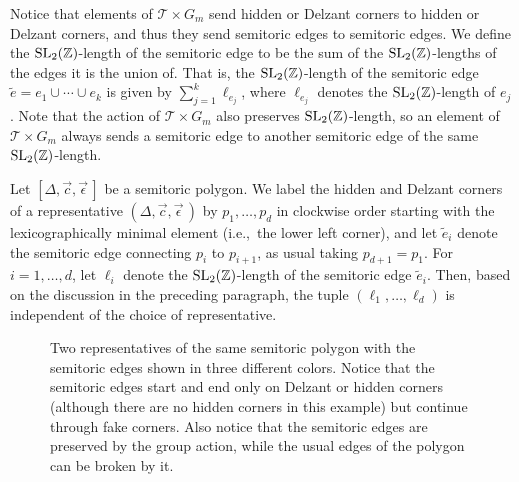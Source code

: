 \documentclass[pdftex]{sigma}
\numberwithin{equation}{section}
\def\Z{{\mathbb Z}}
\newcommand{\De}{\Delta}
\newcommand{\SL}{{\rm SL}_2(\Z)}
\newcommand{\stpoly}{[\De,\vec{c},\vec{\epsilon}\,]}
\newcommand{\strep}{(\De,\vec{c},\vec{\epsilon}\,)}
\begin{document}
Notice that elements of $\mathcal{T}\times G_m$ send hidden or Delzant corners to hidden or Delzant corners, and thus they send semitoric edges to semitoric edges.
We define the $\SL$-length of the semitoric edge to be the sum of the $\SL$-lengths of the edges it is the union of. That is, the $\SL$-length of the semitoric edge $\tilde{e} = e_1\cup \cdots \cup e_k$ is given by $\sum_{j=1}^k \ell_{e_j}$, where $\ell_{e_j}$ denotes the $\SL$-length of $e_j$.
Note that the action of $\mathcal{T}\times G_m$ also preserves $\SL$-length, so an element of $\mathcal{T}\times G_m$ always sends a semitoric edge to another semitoric edge of the same $\SL$-length.

Let $\stpoly$ be a semitoric polygon. We label the hidden and Delzant corners of a representative $\strep$ by $p_1,\ldots,p_d$ in clockwise order starting with the lexicographically minimal element (i.e.,~the lower left corner), and let $\tilde{e}_i$ denote the semitoric edge connecting $p_i$ to $p_{i+1}$, as usual taking $p_{d+1} = p_1$. For $i=1,\dots,d$, let $\ell_i$ denote the $\SL$-length of the semitoric edge $\tilde{e}_i$. Then, based on the discussion in the preceding paragraph, the tuple $(\ell_1,\ldots,\ell_d)$ is independent of the choice of representative.

 \begin{figure}[t]
 \centering
 \begin{subfigure}{.45\linewidth}
 \centering
 \caption{}
 \label{fig:st-edges-a}
 \end{subfigure}
 \begin{subfigure}{.45\linewidth}
 \centering
 \caption{}
 \label{fig:st-edges-b}
 \end{subfigure}
 \caption{Two representatives of the same semitoric polygon with the semitoric edges shown in three different colors. Notice that the semitoric edges start and end only on Delzant or hidden corners (although there are no hidden corners in this example) but continue through fake corners. Also notice that the semitoric edges are preserved by the group action, while the usual edges of the polygon can be broken by it.}
 \label{fig:st-edges}
 \end{figure}
\end{document}
